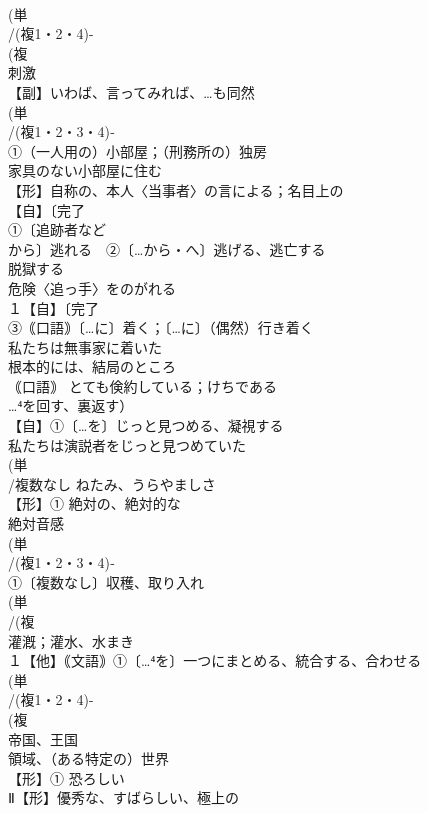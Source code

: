 \documentclass[8pt]{extreport}
\begin{document}
\begin{CJK}{UTF8}{min}
\\	(単
\\	/(複1・2・4)-
\\	(複
\\	刺激 
\\	【副】いわば、言ってみれば、…も同然
\\	(単
\\	/(複1・2・3・4)‐
\\	①（一人用の）小部屋；（刑務所の）独房 
\\	家具のない小部屋に住む 
\\	【形】自称の、本人〈当事者〉の言による；名目上の 
\\	【自】〔完了
\\	①〔追跡者など
\\	から〕逃れる　②〔…から・へ〕逃げる、逃亡する 
\\	脱獄する 
\\	危険〈追っ手〉をのがれる
\\	１【自】〔完了
\\	③｟口語｠〔…に〕着く；〔…に〕（偶然）行き着く 
\\	私たちは無事家に着いた
\\	根本的には、結局のところ
\\	｟口語｠ とても倹約している；けちである 
\\	…⁴を回す、裏返す）
\\	【自】①〔…を〕じっと見つめる、凝視する 
\\	私たちは演説者をじっと見つめていた
\\	(単
\\	/複数なし ねたみ、うらやましさ 
\\	【形】① 絶対の、絶対的な 
\\	絶対音感
\\	(単
\\	/(複1・2・3・4)‐
\\	①〔複数なし〕収穫、取り入れ 
\\	(単
\\	/(複
\\	灌漑；灌水、水まき 
\\	１【他】｟文語｠①〔…⁴を〕一つにまとめる、統合する、合わせる 
\\	(単
\\	/(複1・2・4)-
\\	(複
\\	帝国、王国 
\\	領域、（ある特定の）世界
\\	【形】① 恐ろしい 
\\	Ⅱ【形】優秀な、すばらしい、極上の 

\end{CJK}
\end{document}

